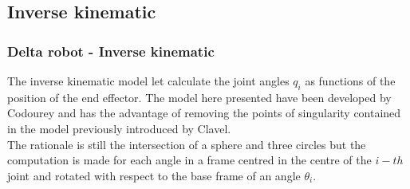 \subsection{Inverse kinematic}
\begin{frame}
\frametitle{Delta robot - Inverse kinematic}
The inverse kinematic model let calculate the joint angles $q_i$ as functions of the position of the end effector.
The model here presented have been developed by Codourey  and has the advantage of removing the points of singularity contained in the model previously introduced by Clavel.\\
The rationale is still the intersection of a sphere and three circles but the computation is made for each angle in a frame centred in the centre of the $i-th$ joint and rotated with respect to the base frame of an angle $\theta_i$.
\end{frame}
%
%

